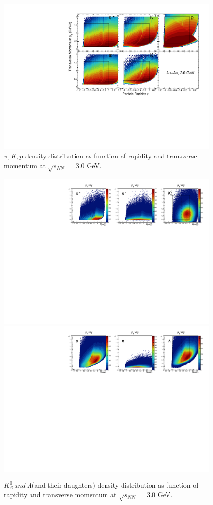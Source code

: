 \begin{figure}[hbt!]
\centering
\includegraphics[width=0.55\linewidth]{figures/chapter02/3gev_piKp_acceptance.pdf}
\caption{$\pi, K, p$ density distribution as function of rapidity and transverse momentum at $\sqrt{s_{NN}}$ = 3.0 GeV.}
\label{fig:3gev_piKp_acceptance}
\end{figure}


\begin{figure}[hbt!]
\centering
\includegraphics[width=0.55\linewidth]{figures/chapter02/3gev_K0s_acceptance.pdf}
\includegraphics[width=0.55\linewidth]{figures/chapter02/3gev_lambda_acceptance.pdf}
\caption{$K^{0}_{S}~and~\Lambda$(and their daughters) density distribution as function of rapidity and transverse momentum at $\sqrt{s_{NN}}$ = 3.0 GeV.}
\label{fig:3gev_K0s_lambda_acceptance}
\end{figure}


